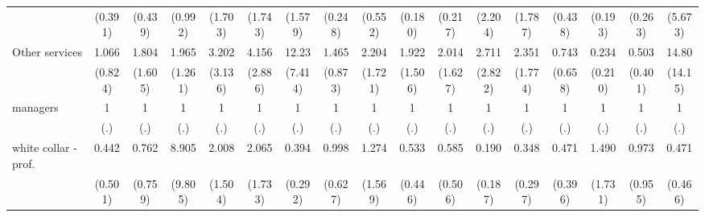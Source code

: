 {\begin{tabular}{l*{16}{c}}
                    &     (0.391)         &     (0.439)         &     (0.992)         &     (1.703)         &     (1.743)         &     (1.579)         &     (0.248)         &     (0.552)         &     (0.180)         &     (0.217)         &     (2.204)         &     (1.787)         &     (0.438)         &     (0.193)         &     (0.263)         &     (5.673)         \\
[1em]
Other services      &       1.066         &       1.804         &       1.965         &       3.202         &       4.156\sym{*}  &       12.23\sym{***}&       1.465         &       2.204         &       1.922         &       2.014         &       2.711         &       2.351         &       0.743         &       0.234         &       0.503         &       14.80\sym{**} \\
                    &     (0.824)         &     (1.605)         &     (1.261)         &     (3.136)         &     (2.886)         &     (7.414)         &     (0.873)         &     (1.721)         &     (1.506)         &     (1.627)         &     (2.822)         &     (1.774)         &     (0.658)         &     (0.210)         &     (0.401)         &     (14.15)         \\
[1em]
managers            &           1         &           1         &           1         &           1         &           1         &           1         &           1         &           1         &           1         &           1         &           1         &           1         &           1         &           1         &           1         &           1         \\
                    &         (.)         &         (.)         &         (.)         &         (.)         &         (.)         &         (.)         &         (.)         &         (.)         &         (.)         &         (.)         &         (.)         &         (.)         &         (.)         &         (.)         &         (.)         &         (.)         \\
[1em]
white collar - prof.&       0.442         &       0.762         &       8.905\sym{*}  &       2.008         &       2.065         &       0.394         &       0.998         &       1.274         &       0.533         &       0.585         &       0.190         &       0.348         &       0.471         &       1.490         &       0.973         &       0.471         \\
                    &     (0.501)         &     (0.759)         &     (9.805)         &     (1.504)         &     (1.733)         &     (0.292)         &     (0.627)         &     (1.569)         &     (0.446)         &     (0.506)         &     (0.187)         &     (0.297)         &     (0.396)         &     (1.731)         &     (0.955)         &     (0.466)         \\

\end{tabular}}
